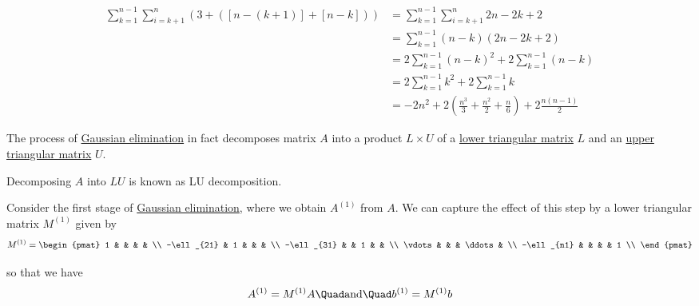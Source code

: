 \begin{compute}
  \begin{align*}
    \sum_{k=1}^{n-1}\sum_{i=k+1}^n(3+([n-(k+1)]+[n-k]))
     &=\sum_{k=1}^{n-1}\sum_{i=k+1}^n2n-2k+2                                \\
     &=\sum_{k=1}^{n-1}(n-k)(2n-2k+2)                                       \\
     &=2\sum_{k=1}^{n-1}(n-k)^2 +2\sum_{k=1}^{n-1}(n-k)                     \\
     &=2\sum_{k=1}^{n-1}k^2 +2\sum_{k=1}^{n-1}k                             \\
     &=-2n^2+2\left(\frac{n^3}3+\frac{n^2}2+\frac n6\right)+2\frac{n(n-1)}2
  \end{align*}

\end{compute}

\label{f8b347e}

The process of \href{b1c3071}{Gaussian elimination} in fact decomposes matrix
$A$ into a product $L\times U$ of a \href{ce94591}{lower triangular matrix} $L$
and an \href{c39b6bf}{upper triangular matrix} $U$.

Decomposing $A$ into $LU$ is known as LU decomposition.

\label{dbfca19}

Consider the first stage of \href{bcdabd2}{Gaussian elimination}, where we
obtain $A^{(1)}$ from $A$. We can capture the effect of this step by a lower
triangular matrix $M^{(1)}$ given by
$$
  M^{(1)}=\begin{pmat}
    1          &   &   &        &   \\
    -\ell_{21} & 1 &   &        &   \\
    -\ell_{31} &   & 1 &        &   \\
    \vdots     &   &   & \ddots &   \\
    -\ell_{n1} &   &   &        & 1 \\
  \end{pmat}
$$

so that we have
$$
  A^{(1)}=M^{(1)}A\Quad\text{and}\Quad
  b^{(1)}=M^{(1)}b
$$

